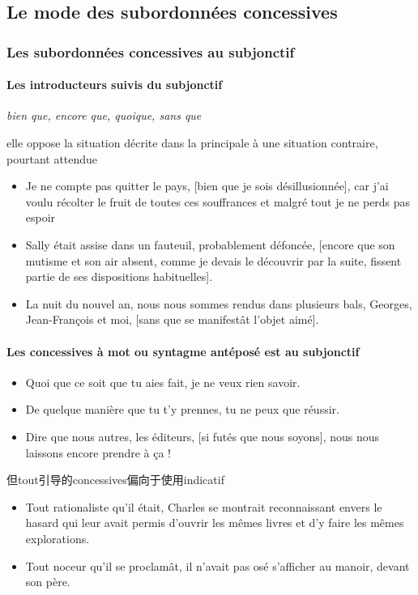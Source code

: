 \documentclass[UTF8]{report}
\begin{document}
\subsection{Le mode des subordonnées concessives}
\subsubsection{Les subordonnées concessives au subjonctif}
\paragraph{Les introducteurs suivis du subjonctif}
\textit{bien que, encore que, quoique, sans que}

elle oppose la situation décrite dans la principale à une situation contraire, pourtant attendue

\begin{itemize}
    \item Je ne compte pas quitter le pays, [bien que je sois désillusionnée], car j’ai voulu récolter le fruit de toutes ces souffrances et malgré tout je ne perds pas espoir
    \item Sally était assise dans un fauteuil, probablement défoncée, [encore que son mutisme et son air absent, comme je devais le découvrir par la suite, fissent partie de ses dispositions habituelles].
    \item La nuit du nouvel an, nous nous sommes rendus dans plusieurs bals, Georges, Jean-François et moi, [sans que se manifestât l’objet aimé].
\end{itemize}

\paragraph{Les concessives à mot ou syntagme antéposé est au subjonctif}

\begin{itemize}
    \item Quoi que ce soit que tu aies fait, je ne veux rien savoir.
    \item De quelque manière que tu t’y prennes, tu ne peux que réussir.
    \item Dire que nous autres, les éditeurs, [si futés que nous soyons], nous nous laissons encore prendre à ça !
\end{itemize}

但tout引导的concessives偏向于使用indicatif

\begin{itemize}
    \item Tout rationaliste qu’il était, Charles se montrait reconnaissant envers le hasard qui leur avait permis d’ouvrir les mêmes livres et d’y faire les mêmes explorations.
    \item Tout noceur qu’il se proclamât, il n’avait pas osé s’afficher au manoir, devant son père.
\end{itemize}
\end{document}
